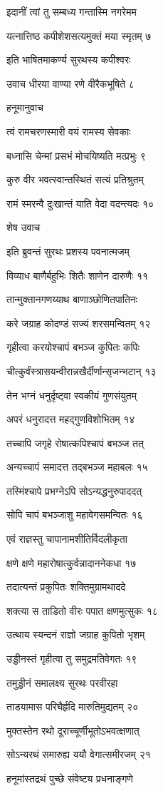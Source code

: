 इदानीं त्वां तु सम्बध्य गन्तास्मि नगरेमम

यत्नात्तिष्ठ कपीशेशसत्यमुक्तं मया स्मृतम् ७

इति भाषितमाकर्ण्य सुरथस्य कपीश्वरः

उवाच धीरया वाण्या रणे वीरैकभूषिते ८

हनूमानुवाच

त्वं रामचरणस्मारी वयं रामस्य सेवकाः

बध्नासि चेन्मां प्रसभं मोचयिष्यति मत्प्रभुः ९

कुरु वीर भवत्स्वान्तस्थितं सत्यं प्रतिश्रुतम्

रामं स्मरन्वै दुःखान्तं याति वेदा वदन्त्यदः १०

शेष उवाच

इति ब्रुवन्तं सुरथः प्रशस्य पवनात्मजम्

विव्याध बाणैर्बहुभिः शितैः शाणेन दारुणैः ११

तान्मुक्तानगणय्याथ बाणाञ्छोणितपातिनः

करे जग्राह कोदण्डं सज्यं शरसमन्वितम् १२

गृहीत्वा करयोश्चापं बभञ्ज कुपितः कपिः

चीत्कुर्वंस्त्रासयन्वीरान्नखैर्दीर्णान्सृजन्भटान् १३

तेन भग्नं धनुर्दृष्ट्वा स्वकीयं गुणसंयुतम्

अपरं धनुरादत्त महद्गुणविशोभितम् १४

तच्चापि जगृहे रोषात्कपिश्चापं बभञ्ज तत्

अन्यच्चापं समादत्त तद्बभञ्ज महाबलः १५

तस्मिंश्चापे प्रभग्नेऽपि सोऽन्यद्धनुरुपाददत्

सोपि चापं बभञ्जाशु महावेगसमन्वितः १६

एवं राज्ञस्तु चापानामशीतिर्विदलीकृता

क्षणे क्षणे महारोषात्कुर्वन्नादाननेकधा १७

तदात्यन्तं प्रकुपितः शक्तिमुग्रामथाददे

शक्त्या स ताडितो वीरः पपात क्षणमुत्सुकः १८

उत्थाय स्यन्दनं राज्ञो जग्राह कुपितो भृशम्

उड्डीनस्तं गृहीत्वा तु समुद्रमतिवेगतः १९

तमुड्डीनं समालक्ष्य सुरथः परवीरहा

ताडयामास परिघैर्हृदि मारुतिमुद्यतम् २०

मुक्तस्तेन रथो दूराच्चूर्णीभूतोऽभवत्क्षणात्

सोऽन्यरथं समारुह्य ययौ वेगात्समीरजम् २१

हनूमांस्तद्रथं पुच्छे संवेष्ट्य प्रधनाङ्गणे

